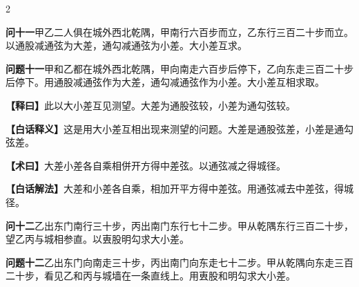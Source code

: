 \documentclass[11pt,a4paper]{article}
\newcommand{\WenQuestion}[1]{\textbf{\textcolor{classicalcolor}{#1}}}
\newcommand{\BaiQuestion}[1]{\textbf{\textcolor{moderncolor}{#1}}}
\newcommand{\WenExplain}{\textcolor{classicalcolor}{\textbf{【释曰】}}}
\newcommand{\BaiExplain}{\textcolor{moderncolor}{\textbf{【白话释义】}}}
\newcommand{\WenMethod}{\textcolor{classicalcolor}{\textbf{【术曰】}}}
\newcommand{\BaiMethod}{\textcolor{moderncolor}{\textbf{【白话解法】}}}
\begin{document}
\begin{paracol}{2}

\switchcolumn*
\begin{tcolorbox}[colback=red!3,colframe=red!30!black,boxrule=0.3pt]
\WenQuestion{问十一}\quad 甲乙二人俱在城外西北乾隅，甲南行六百步而立，乙东行三百二十步而立。以通股减通弦为大差，通勾减通弦为小差。大小差互求。
\end{tcolorbox}
\switchcolumn
\begin{tcolorbox}[colback=blue!3,colframe=blue!30!black,boxrule=0.3pt]
\BaiQuestion{问题十一}\quad 甲和乙都在城外西北乾隅，甲向南走六百步后停下，乙向东走三百二十步后停下。用通股减通弦作为大差，通勾减通弦作为小差。大小差互相求取。
\end{tcolorbox}

\switchcolumn*
\begin{tcolorbox}[colback=red!5,colframe=red!30!black,boxrule=0.3pt]
\WenExplain\quad 此以大小差互见测望。大差为通股弦较，小差为通勾弦较。
\end{tcolorbox}
\switchcolumn
\begin{tcolorbox}[colback=blue!5,colframe=blue!30!black,boxrule=0.3pt]
\BaiExplain\quad 这是用大小差互相出现来测望的问题。大差是通股弦差，小差是通勾弦差。
\end{tcolorbox}

\switchcolumn*
\begin{tcolorbox}[colback=red!5,colframe=red!40!black,boxrule=0.3pt]
\WenMethod\quad 大差小差各自乘相併开方得中差弦。以通弦减之得城径。
\end{tcolorbox}
\switchcolumn
\begin{tcolorbox}[colback=blue!5,colframe=blue!40!black,boxrule=0.3pt]
\BaiMethod\quad 大差和小差各自乘，相加开平方得中差弦。用通弦减去中差弦，得城径。
\end{tcolorbox}

\vspace{0.8em}

\switchcolumn*
\begin{tcolorbox}[colback=red!3,colframe=red!30!black,boxrule=0.3pt]
\WenQuestion{问十二}\quad 乙出东门南行三十步，丙出南门东行七十二步。甲从乾隅东行三百二十步，望乙丙与城相参直。以叀股明勾求大小差。
\end{tcolorbox}
\switchcolumn
\begin{tcolorbox}[colback=blue!3,colframe=blue!30!black,boxrule=0.3pt]
\BaiQuestion{问题十二}\quad 乙出东门向南走三十步，丙出南门向东走七十二步。甲从乾隅向东走三百二十步，看见乙和丙与城墙在一条直线上。用叀股和明勾求大小差。
\end{tcolorbox}


\end{paracol}
\end{document}
